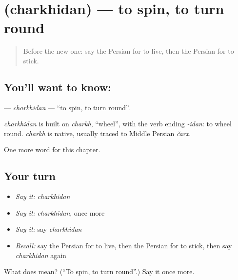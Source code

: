 \section[\texorpdfstring{\fa{چرخیدن} (charkhidan)}{چرخیدن (charkhidan)}]{ (charkhidan) — to spin, to turn round}

\label{lesson:FA-C135-charkhidan}



\begin{quote}
Before the new one: say the Persian for to live, then the Persian for to stick.
\end{quote}

\subsection*{You'll want to know: }
\textbf{} — \emph{charkhidan} — \textquotedblleft{}to spin, to turn round\textquotedblright{}.

\begin{cousinweb}
\emph{charkhidan} is built on \emph{charkh}, \textquotedblleft{}wheel\textquotedblright{}, with the verb ending \emph{-idan}: to wheel round. \emph{charkh} is native, usually traced to Middle Persian \emph{čarx}.
\end{cousinweb}

\begin{grammarlens}[title={What you've built}]
One more word for this chapter.
\end{grammarlens}

\subsection*{Your turn}
\begin{itemize}
\raggedright
  \item \emph{Say it:} \emph{charkhidan}
  \item \emph{Say it:} \emph{charkhidan}, once more
  \item \emph{Say it:} say \emph{charkhidan}
  \item \emph{Recall:} say the Persian for to live, then the Persian for to stick, then say \emph{charkhidan} again
\end{itemize}

\begin{tcolorbox}[breakable,colback=teal!4,colframe=teal!35!black,title={Before you move on}]
What does  mean? (\textquotedblleft{}To spin, to turn round\textquotedblright{}.) Say it once more.
\end{tcolorbox}
